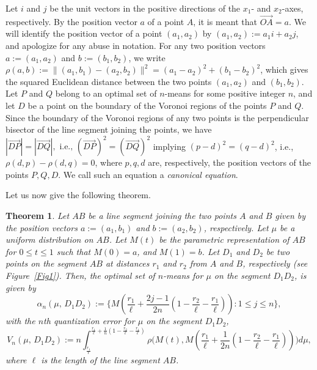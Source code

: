 \documentclass[12pt]{amsart}
\theoremstyle{plain}
\newtheorem{theorem}[subsection]{Theorem}
\theoremstyle{definition}
\newcommand{\ga}{\alpha}
\newcommand{\tit}{\textit}%
\newcommand{\te}{\text}%
\begin{document}
Let $i$ and $j$ be the unit vectors in the positive directions of the $x_1$- and $x_2$-axes, respectively. By the position vector $a$ of a point $A$, it is meant that $\overrightarrow{OA}=a$. We will identify the position vector of a point $(a_1, a_2)$ by $(a_1, a_2):=a_1 i +a_2 j$, and apologize for any abuse in notation. For any two position vectors $  a:=( a_1, a_2)$ and $  b:=( b_1, b_2)$, we write $\rho(a, b):=\|(a_1, b_1)-(a_2, b_2)\|^2=(a_1-a_2)^2 +(b_1-b_2)^2$, which gives the squared Euclidean distance between the two points $(a_1, a_2)$ and $(b_1, b_2)$.  Let $P$ and $Q$ belong to an optimal set of $n$-means for some positive integer $n$, and let $D$ be a point on the boundary of the Voronoi regions of the points $P$ and $Q$. Since the boundary of the Voronoi regions of any two points is the perpendicular bisector of the line segment joining the points, we have
$|\overrightarrow{DP}|=|\overrightarrow{DQ}|, \te{ i.e., } (\overrightarrow{DP})^2=(\overrightarrow{DQ})^2$ implying
$(  p-  d)^2=(  q-  d)^2$, i.e., $\rho(  d,   p)-\rho(  d,   q)=0$, where $p, q, d$ are, respectively, the position vectors of the points $P, Q, D$. We call such an equation a \tit{canonical equation}.

Let us now give the following theorem.



\begin{theorem} \label{theo00}
Let $AB$ be a line segment joining the two points $A$ and $B$ given by the position vectors $a:=(a_1, b_1)$ and $b:=(a_2, b_2)$, respectively. Let $\mu$ be a uniform distribution on $AB$. Let $M(t)$ be the parametric representation of $AB$ for $0\leq t\leq 1$ such that $M(0)=a$, and $M(1)=b$. Let $D_1$ and $D_2$ be two points on the segment $AB$ at distances $r_1$ and $r_2$ from $A$ and $B$, respectively (see Figure~\ref{Fig1}). Then, the optimal set of $n$-means for $\mu$ on the segment $D_1D_2$, is given by
\[\ga_n(\mu,  \, D_1D_2):=\Big\{M(\frac {r_1}{\ell}+\frac {2j-1}{2n} (1-\frac{r_2}{\ell}-\frac{r_1}{\ell})) : 1\leq j\leq n \Big\},\]
with the  $n$th quantization error for $\mu$ on the segment $D_1D_2$,
\[V_n(\mu, \, D_1D_2):=n \int_{\frac {r_1}{\ell}}^{\frac {r_1}{\ell}+\frac {1}{n} (1-\frac{r_2}{\ell}-\frac{r_1}{\ell})}\rho\Big(M(t), M(\frac {r_1}{\ell}+\frac {1}{2n} (1-\frac{r_2}{\ell}-\frac{r_1}{\ell}))\Big) d\mu,\]
where $\ell$ is the length of the line segment $AB$.
\end{theorem}
\end{document}
